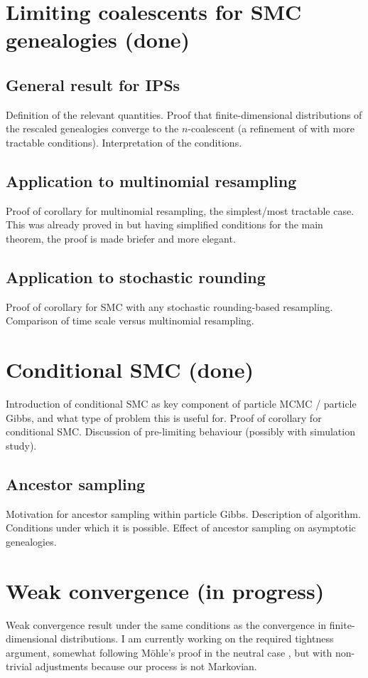 \documentclass{article}
\begin{document}
\section{Limiting coalescents for SMC genealogies (done)}
\subsection{General result for IPSs}
Definition of the relevant quantities. Proof that finite-dimensional distributions of the rescaled genealogies converge to the $n$-coalescent (a refinement of \citet[Theorem 1]{koskela2018} with more tractable conditions). Interpretation of the conditions.
\subsection{Application to multinomial resampling}
Proof of corollary for multinomial resampling, the simplest/most tractable case. This was already proved in \citet{koskela2018} but having simplified conditions for the main theorem, the proof is made briefer and more elegant.
\subsection{Application to stochastic rounding}
Proof of corollary for SMC with any stochastic rounding-based resampling. Comparison of time scale versus multinomial resampling.

\section{Conditional SMC (done)}
Introduction of conditional SMC as key component of particle MCMC / particle Gibbs, and what type of problem this is useful for. Proof of corollary for conditional SMC. Discussion of pre-limiting behaviour (possibly with simulation study).
\subsection{Ancestor sampling}
Motivation for ancestor sampling within particle Gibbs. Description of algorithm. Conditions under which it is possible. Effect of ancestor sampling on asymptotic genealogies.

\section{Weak convergence (in progress)}
Weak convergence result under the same conditions as the convergence in finite-dimensional distributions. I am currently working on the required tightness argument, somewhat following M\"ohle's proof in the neutral case \citep{mohle1999}, but with non-trivial adjustments because our process is not Markovian.
\end{document}
